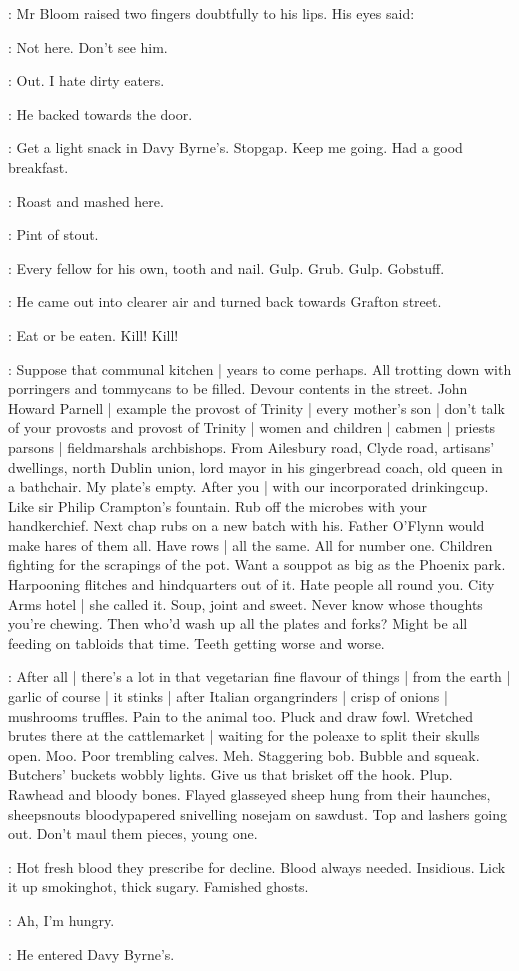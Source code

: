 :
Mr Bloom raised two fingers doubtfully to his lips.
His eyes said:

\Bloom:
Not here.
Don't see him.

\BloomInt:
Out.
I hate dirty eaters.

:
He backed towards the door.

\BloomInt:
Get a light snack in Davy Byrne's.
Stopgap.
Keep me going.
Had a good breakfast.

:
Roast and mashed here.

:
Pint of stout.

\BloomInt:
Every fellow for his own, tooth and nail.
Gulp.
Grub.
Gulp.
Gobstuff.

:
He came out into clearer air and turned back towards Grafton street.

\BloomInt:
Eat or be eaten.
Kill!
Kill!

\BloomInt:
Suppose that communal kitchen |
years to come perhaps.
All trotting down with porringers and tommycans to be filled.
Devour contents in the street.
John Howard Parnell |
example the provost of Trinity |
every mother's son |
don't talk of your provosts and provost of Trinity |
women and children |
cabmen |
priests parsons |
fieldmarshals archbishops.
From Ailesbury road,
Clyde road,
artisans' dwellings,
north Dublin union,
lord mayor in his gingerbread coach,
old queen in a bathchair.
My plate's empty.
After you |
with our incorporated drinkingcup.
Like sir Philip Crampton's fountain.
Rub off the microbes with your handkerchief.
Next chap rubs on a new batch with his.
Father O'Flynn would make hares of them all.
Have rows |
all the same.
All for number one.
Children fighting for the scrapings of the pot.
Want a souppot as big as the Phoenix park.
Harpooning flitches and hindquarters out of it.
Hate people all round you.
City Arms hotel |
 she called it.
Soup, joint and sweet.
Never know whose thoughts you're chewing.
Then who'd wash up all the plates and forks?
Might be all feeding on tabloids that time.
Teeth getting worse and worse.

\BloomInt:
After all |
there's a lot in that vegetarian fine flavour of things |
from the earth |
garlic of course |
it stinks |
after Italian organgrinders |
crisp of onions |
mushrooms truffles.
Pain to the animal too.
Pluck and draw fowl.
Wretched brutes there at the cattlemarket |
waiting for the poleaxe to split their skulls open.
Moo.
Poor trembling calves.
Meh.
Staggering bob.
Bubble and squeak.
Butchers' buckets wobbly lights.
Give us that brisket off the hook.
Plup.
Rawhead and bloody bones.
Flayed glasseyed sheep hung from their haunches,
sheepsnouts bloodypapered snivelling nosejam on sawdust.
Top and lashers going out.
Don't maul them pieces, young one.

\BloomInt:
Hot fresh blood they prescribe for decline.
Blood always needed.
Insidious.
Lick it up smokinghot, thick sugary.
Famished ghosts.

\BloomInt:
Ah, I'm hungry.

:
He entered Davy Byrne's.
